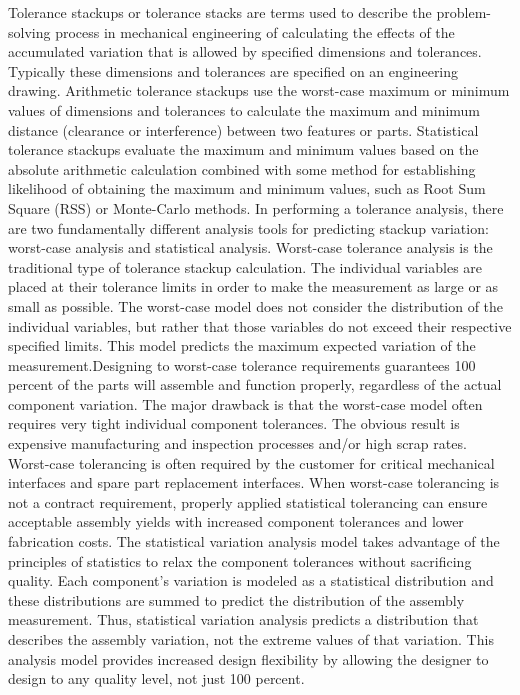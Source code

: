 Tolerance stackups or tolerance stacks are terms used to describe the problem-solving process in mechanical engineering of calculating the effects of the accumulated variation that is allowed by specified dimensions and tolerances. Typically these dimensions and tolerances are specified on an engineering drawing. Arithmetic tolerance stackups use the worst-case maximum or minimum values of dimensions and tolerances to calculate the maximum and minimum distance (clearance or interference) between two features or parts. Statistical tolerance stackups evaluate the maximum and minimum values based on the absolute arithmetic calculation combined with some method for establishing likelihood of obtaining the maximum and minimum values, such as Root Sum Square (RSS) or Monte-Carlo methods.
In performing a tolerance analysis, there are two fundamentally different analysis tools for predicting stackup variation: worst-case analysis and statistical analysis. Worst-case tolerance analysis is the traditional type of tolerance stackup calculation. The individual variables are placed at their tolerance limits in order to make the measurement as large or as small as possible. The worst-case model does not consider the distribution of the individual variables, but rather that those variables do not exceed their respective specified limits. This model predicts the maximum expected variation of the measurement.Designing to worst-case tolerance requirements guarantees 100 percent of the parts will assemble and function properly, regardless of the actual component variation. The major drawback is that the worst-case model often requires very tight individual component tolerances. 
The obvious result is expensive manufacturing and inspection processes and/or high scrap rates. Worst-case tolerancing is often required by the customer for critical mechanical interfaces and spare part replacement interfaces. When worst-case tolerancing is not a contract requirement, properly applied statistical tolerancing can ensure acceptable assembly yields with increased component tolerances and lower fabrication costs. 
The statistical variation analysis model takes advantage of the principles of statistics to relax the component tolerances without sacrificing quality. Each component’s variation is modeled as a statistical distribution and these distributions are summed to predict the distribution of the assembly measurement. Thus, statistical variation analysis predicts a distribution that describes the assembly variation, not the extreme values of that variation. This analysis model provides increased design flexibility by allowing the designer to design to any quality level, not just 100 percent.
